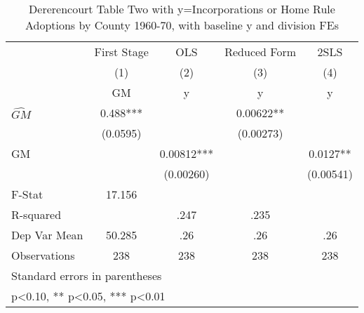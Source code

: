 \begin{table}[htbp]\centering
\def\sym#1{\ifmmode^{#1}\else\(^{#1}\)\fi}
\caption{Dererencourt Table Two with y=Incorporations or Home Rule Adoptions by County 1960-70, with baseline y and division FEs}
\begin{tabular}{l*{4}{c}}
\toprule
                    & First Stage   &         OLS   &Reduced Form   &        2SLS   \\
                    &\multicolumn{1}{c}{(1)}&\multicolumn{1}{c}{(2)}&\multicolumn{1}{c}{(3)}&\multicolumn{1}{c}{(4)}\\
                    &\multicolumn{1}{c}{GM}&\multicolumn{1}{c}{y}&\multicolumn{1}{c}{y}&\multicolumn{1}{c}{y}\\
\midrule
$\hat{GM}$          &       0.488***&               &     0.00622** &               \\
                    &    (0.0595)   &               &   (0.00273)   &               \\
\addlinespace
GM                  &               &     0.00812***&               &      0.0127** \\
                    &               &   (0.00260)   &               &   (0.00541)   \\
\midrule
F-Stat              &      17.156   &               &               &               \\
R-squared           &               &        .247   &        .235   &               \\
Dep Var Mean        &      50.285   &         .26   &         .26   &         .26   \\
Observations        &         238   &         238   &         238   &         238   \\
\bottomrule
\multicolumn{5}{l}{\footnotesize Standard errors in parentheses}\\
\multicolumn{5}{l}{\footnotesize * p<0.10, ** p<0.05, *** p<0.01}\\
\end{tabular}
\end{table}
